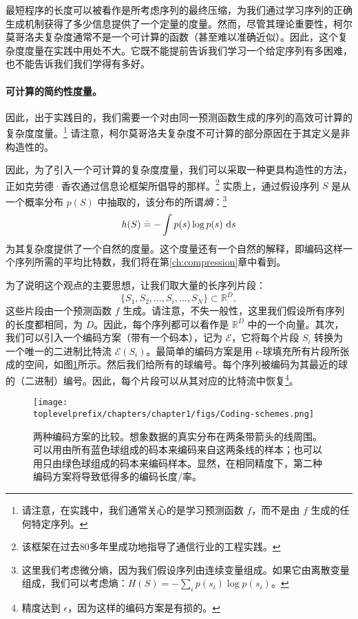 \documentclass[../../book-main.tex]{subfiles}
\begin{document}
最短程序的长度可以被看作是所考虑序列的最终压缩，为我们通过学习序列的正确生成机制获得了多少信息提供了一个定量的度量。然而，尽管其理论重要性，柯尔莫哥洛夫复杂度通常不是一个可计算的函数\cite{Cover-Thomas}（甚至难以准确近似）。因此，这个复杂度度量在实践中用处不大。它既不能提前告诉我们学习一个给定序列有多困难，也不能告诉我们我们学得有多好。






\paragraph{可计算的简约性度量。}
因此，出于实践目的，我们需要一个对由同一预测函数生成的序列的高效可计算的复杂度度量。\footnote{请注意，在实践中，我们通常关心的是学习预测函数 $f$，而不是由 $f$ 生成的任何特定序列。} 请注意，柯尔莫哥洛夫复杂度不可计算的部分原因在于其定义是非构造性的。

因此，为了引入一个可计算的复杂度度量，我们可以采取一种更具构造性的方法，正如克劳德·香农通过信息论框架\cite{Shannon-1948,Cover-Thomas}所倡导的那样。\footnote{该框架在过去80多年里成功地指导了通信行业的工程实践。} 实质上，通过假设序列 $S$ 是从一个概率分布 $p(S)$ 中抽取的，该分布的所谓{\em 熵}：\footnote{这里我们考虑微分熵，因为我们假设序列由连续变量组成。如果它由离散变量组成，我们可以考虑熵：$H(S) = - \sum_{i}p(s_i) \log p(s_i)$。}
\begin{equation}
    h(S) \doteq -\int p(s) \log p(s) ~\mathrm{d}s
    \label{eqn:entropy-definition}
\end{equation}
为其复杂度提供了一个自然的度量。这个度量还有一个自然的解释，即编码这样一个序列所需的平均比特数，我们将在第\ref{ch:compression}章中看到。

为了说明这个观点的主要思想，让我们取大量的长序列片段：
\begin{equation}
    \{S_1, S_2, \ldots, S_i, \ldots, S_N\} \subset \mathbb{R}^D,
\end{equation}
这些片段由一个预测函数 $f$ 生成。请注意，不失一般性，这里我们假设所有序列的长度都相同，为 $D$。因此，每个序列都可以看作是 $\mathbb{R}^D$ 中的一个向量。其次，我们可以引入一个编码方案（带有一个码本），记为 $\mathcal E$，它将每个片段 $S_i$ 转换为一个唯一的二进制比特流 $\mathcal{E}(S_i)$。最简单的编码方案是用 $\epsilon$-球填充所有片段所张成的空间，如图\ref{fig:coding-schemes}所示。然后我们给所有的球编号。每个序列被编码为其最近的球的（二进制）编号。因此，每个片段可以从其对应的比特流中恢复\footnote{精度达到 $\epsilon$，因为这样的编码方案是有损的。}。
\begin{figure}
    \centering
    \texttt{[image: \\toplevelprefix/chapters/chapter1/figs/Coding-schemes.png]}
    \caption{两种编码方案的比较。想象数据的真实分布在两条带箭头的线周围。可以用由所有蓝色球组成的码本来编码来自这两条线的样本；也可以用只由绿色球组成的码本来编码样本。显然，在相同精度下，第二种编码方案将导致低得多的编码长度/率。}
    \label{fig:coding-schemes}
\end{figure}
\end{document}
